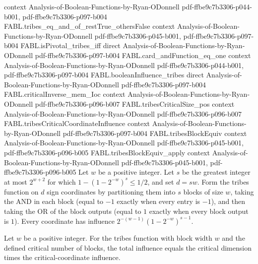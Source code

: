 \begin{theorem}
  {context}
  {Analysis-of-Boolean-Functions-by-Ryan-ODonnell}
  {pdf-ffbe9c7b3306-p044-b001,
    pdf-ffbe9c7b3306-p097-b004}
\proofstep
  {FABL.tribes_eq_and_of_restTrue_othersFalse}
  {context}
  {Analysis-of-Boolean-Functions-by-Ryan-ODonnell}
  {pdf-ffbe9c7b3306-p045-b001,
    pdf-ffbe9c7b3306-p097-b004}
\proofstep
  {FABL.isPivotal_tribes_iff}
  {direct}
  {Analysis-of-Boolean-Functions-by-Ryan-ODonnell}
  {pdf-ffbe9c7b3306-p097-b004}
\proofstep
  {FABL.card_andFunction_eq_one}
  {context}
  {Analysis-of-Boolean-Functions-by-Ryan-ODonnell}
  {pdf-ffbe9c7b3306-p044-b001,
    pdf-ffbe9c7b3306-p097-b004}
\proofstep
  {FABL.booleanInfluence_tribes}
  {direct}
  {Analysis-of-Boolean-Functions-by-Ryan-ODonnell}
  {pdf-ffbe9c7b3306-p097-b004}
\proofstep
  {FABL.criticalInverse_mem_Ioc}
  {context}
  {Analysis-of-Boolean-Functions-by-Ryan-ODonnell}
  {pdf-ffbe9c7b3306-p096-b007}
\proofstep
  {FABL.tribesCriticalSize_pos}
  {context}
  {Analysis-of-Boolean-Functions-by-Ryan-ODonnell}
  {pdf-ffbe9c7b3306-p096-b007}
\proofstep
  {FABL.tribesCriticalCoordinateInfluence}
  {context}
  {Analysis-of-Boolean-Functions-by-Ryan-ODonnell}
  {pdf-ffbe9c7b3306-p097-b004}
\proofstep
  {FABL.tribesBlockEquiv}
  {context}
  {Analysis-of-Boolean-Functions-by-Ryan-ODonnell}
  {pdf-ffbe9c7b3306-p045-b001,
    pdf-ffbe9c7b3306-p096-b005}
\proofstep
  {FABL.tribesBlockEquiv_apply}
  {context}
  {Analysis-of-Boolean-Functions-by-Ryan-ODonnell}
  {pdf-ffbe9c7b3306-p045-b001,
    pdf-ffbe9c7b3306-p096-b005}
Let $w$ be a positive integer. Let $s$ be the greatest integer at most $2^{w+2}$ for
which $1-(1-2^{-w})^s\leq 1/2$, and set $d=sw$. Form the tribes function on $d$ sign
coordinates by partitioning them into $s$ blocks of size $w$, taking the AND in each
block (equal to $-1$ exactly when every entry is $-1$), and then taking the OR of the
block outputs (equal to $1$ exactly when every block output is $1$). Every coordinate
has influence $2^{-(w-1)}(1-2^{-w})^{s-1}$.
\end{theorem}

\begin{theorem}
\label{FABL.totalInfluence_tribesCritical}
\leanok
{}
Let $w$ be a positive integer. For the tribes function with block width $w$ and the
defined critical number of blocks, the total influence equals the critical dimension
times the critical-coordinate influence.
\end{theorem}

